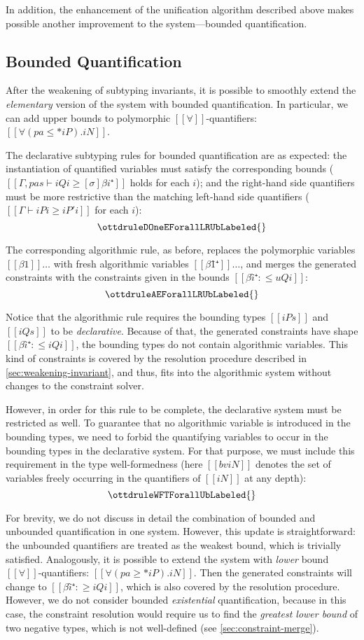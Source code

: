 In addition, the enhancement of the unification algorithm described above
makes possible another improvement to the system---bounded quantification.

\subsection{Bounded Quantification}

After the weakening of subtyping invariants, 
it is possible to smoothly extend the \emph{elementary}
version of the system with bounded quantification.
In particular, we can add upper bounds to polymorphic $[[∀]]$-quantifiers:
$[[∀(pa ≤* iP). iN]]$. 

The declarative subtyping rules for bounded quantification are as expected:
the instantiation of quantified variables must satisfy the corresponding bounds
($[[Γ, pas ⊢ iQi ≥ [σ]βi⁺]]$ holds for each $i$);
and the right-hand side quantifiers must be more restrictive than the matching left-hand side
quantifiers ($[[Γ ⊢ iPi ≥ iP'i]]$ for each $i$):
$$\ottdruleDOneEForallLRUbLabeled{}$$

The corresponding algorithmic rule, as before,
replaces the polymorphic variables $[[β1]]\dots$ with fresh 
algorithmic variables $[[β1̂⁺]]\dots$, and merges the generated
constraints with the constraints given in the bounds
$[[βî⁺ :≤ uQi]]$:
$$\ottdruleAEForallLRUbLabeled{}$$

Notice that the algorithmic rule 
requires the bounding types $[[iPs]]$ and $[[iQs]]$ to be \emph{declarative}.
Because of that, the generated constraints have shape $[[βî⁺ :≤ iQi]]$,
\ie the bounding types do not contain algorithmic variables.
This kind of constraints is covered by the resolution procedure described in
\cref{sec:weakening-invariant}, and thus,  fits 
into the algorithmic system without changes to the constraint solver.

However, in order for this rule to be complete, 
the declarative system must be restricted as well.
To guarantee that no algorithmic variable is introduced in the bounding types,
we need to forbid the quantifying variables to occur in the bounding types in the declarative system.
For that purpose, we must include this requirement in the type well-formedness
(here $[[bv iN]]$ denotes the set of variables freely occurring 
in the quantifiers of $[[iN]]$ at any depth):
$$\ottdruleWFTForallUbLabeled{}$$

For brevity, we do not discuss in detail the combination of bounded and
unbounded quantification in one system. However, this update is straightforward:
the unbounded quantifiers are treated as the weakest bound, which is trivially
satisfied. Analogously, it is possible to extend the system with \emph{lower}
bound $[[∀]]$-quantifiers: $[[∀(pa ≥* iP). iN]]$. 
Then the generated constraints will change to $[[βî⁺ :≥ iQi]]$, which 
is also covered by the resolution procedure.
However, we do not consider bounded \emph{existential} quantification,
because in this case, the constraint resolution would require us to 
find the \emph{greatest lower bound} of two negative types, which is not
well-defined (see \cref{sec:constraint-merge}).

